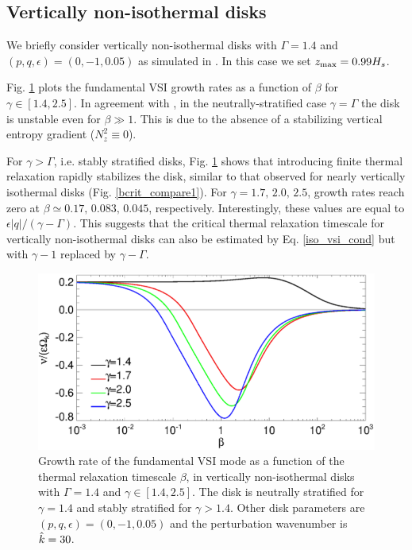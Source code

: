 \subsection{Vertically non-isothermal disks} 
We briefly consider vertically non-isothermal disks with 
$\Gamma=1.4$ and $(p,q,\epsilon)=(0,-1,0.05)$ as simulated in
\cite{nelson13}. In this case we set $z_\mathrm{max}=0.99H_s$.  

Fig. \ref{gcorr_compare_vnoniso} plots the fundamental VSI growth
rates as a function of $\beta$ for $\gamma\in[1.4,2.5]$. In agreement
with \citeauthor{nelson13}, in   
the neutrally-stratified case $\gamma=\Gamma$ the disk is unstable 
even for $\beta\gg 1$. This is due to the absence of a stabilizing
vertical entropy gradient ($N_z^2\equiv 0$). %

For $\gamma>\Gamma$, i.e. stably stratified disks,
Fig. \ref{gcorr_compare_vnoniso} shows that introducing finite thermal
relaxation rapidly stabilizes the disk, similar to that observed for
nearly vertically isothermal disks (Fig. \ref{bcrit_compare1}). For
$\gamma=1.7,\,2.0,\,2.5$, growth rates reach zero at
$\beta\simeq0.17,\,0.083,\,0.045$, respectively. Interestingly, these
values are equal to $\epsilon|q|/(\gamma-\Gamma)$. This suggests that
the critical thermal relaxation timescale for vertically
non-isothermal disks can also be estimated by Eq. \ref{iso_vsi_cond}
but with $\gamma-1$ replaced by $\gamma-\Gamma$. 

\begin{figure}
  \includegraphics[width=\linewidth,clip=true,trim=0cm 0cm 0cm
  0cm]{figures/gcorr_compare_vnoniso2}
  \caption{Growth rate of the fundamental VSI mode as a function of
    the thermal relaxation timescale $\beta$, in vertically
    non-isothermal disks with $\Gamma=1.4$ and
    $\gamma\in[1.4,2.5]$. The disk is neutrally
    stratified for $\gamma=1.4$ and stably stratified for
    $\gamma>1.4$. Other disk parameters are
    $(p,q,\epsilon)=(0,-1,0.05)$ and the perturbation wavenumber is
    $\hat{k}=30$.   
    \label{gcorr_compare_vnoniso}}
\end{figure}












